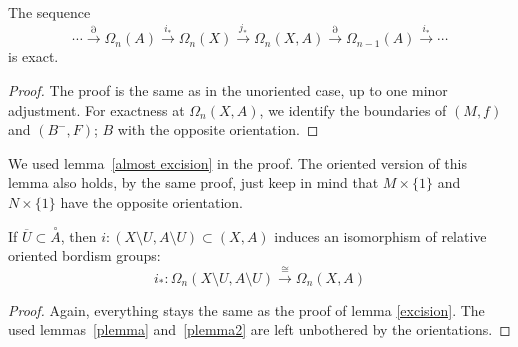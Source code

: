 \documentclass[a4paper,11pt]{article}
\begin{document}
\begin{lemma}
    The sequence
    \[\cdots\xrightarrow{\partial}\Omega_n(A)\xrightarrow{i_\ast}\Omega_n(X)\xrightarrow{j_\ast}\Omega_n(X,A)\xrightarrow{\partial}\Omega_{n-1}(A)\xrightarrow{i_\ast}\cdots\]
    is exact.
\end{lemma}

\begin{proof}\cite{conner}
    The proof is the same as in the unoriented case, up to one minor adjustment. For exactness at \(\Omega_n(X,A)\), we identify the boundaries of \((M,f)\) and \((B^-,F)\); \(B\) with the opposite orientation.
\begin{comment}
    \begin{itemize}
        \item \textbf{Exactness at \(\Omega_n(A)\)}: \(i_\ast\circ\partial=0\), as \((M,f)\) is a nullbordism for \(i_\ast\circ\partial(M,f)=\partial(M,f)\)\\
        For a nullbordism \((B,g)\) of \(M,f\), \(\partial(B,g)=(M,f)\).
        \item \textbf{Exactness at \(\Omega_n(X)\)}: 
        \(j_\ast\circ i_\ast=0\) exactly as in the unoriented case.

        \item \textbf{Exactness at \(\Omega_n(X,A)\)}: 
    \end{itemize}
\end{comment}
\end{proof}

\begin{remark}
    We used lemma\ \ref{almost excision} in the proof. The oriented version of this lemma also holds, by the same proof, just keep in mind that \(M\times\{1\}\) and \(N\times\{1\}\) have the opposite orientation.
\end{remark}

\begin{lemma}
    If \(\overline{U}\subset\overset{\circ}{A}\), then \(i:(X\setminus U, A\setminus U)\subset (X,A)\) induces an isomorphism of relative oriented bordism groups:
    \[i_\ast:\Omega_n(X\setminus U,A\setminus U)\xrightarrow{\cong}\Omega_n(X,A)\]
\end{lemma}

\begin{proof}\cite{conner}
    Again, everything stays the same as the proof of lemma \ref{excision}. The used lemmas\ \ref{plemma} and\ \ref{plemma2} are left unbothered by the orientations.
\end{proof}
\end{document}

